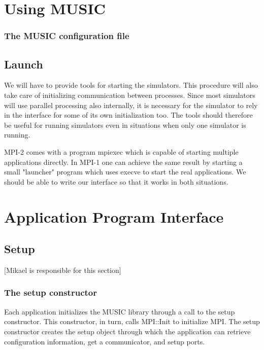 \documentclass[a4paper]{report}
\newenvironment{metatext}%
{\color{blue}}%
{}
\newcommand{\responsible}[1]%
{{\color{red}[#1 is responsible for this section]}}
\begin{document}
\chapter{Using MUSIC}

\subsection{The MUSIC configuration file}

\section{Launch}

We will have to provide tools for starting the simulators.  This
procedure will also take care of initializing communication between
processes.  Since most simulators will use parallel processing also
internally, it is necessary for the simulator to rely in the interface
for some of its own initialization too.  The tools should therefore be
useful for running simulators even in situations when only one
simulator is running.

\begin{metatext}
  MPI-2 comes with a program mpiexec which is capable of starting
  multiple applications directly.  In MPI-1 one can achieve the same
  result by starting a small "launcher" program which uses execve to
  start the real applications.  We should be able to write our interface
  so that it works in both situations.
\end{metatext}

\chapter{Application Program Interface}

\section{Setup}
\responsible{Mikael}

\subsection{The setup constructor}

Each application initializes the MUSIC library through a call to the
setup constructor.  This constructor, in turn, calls MPI::Init to
initialize MPI.  The setup constructor creates the setup object
through which the application can retrieve configuration information,
get a communicator, and setup ports.
\end{document}
